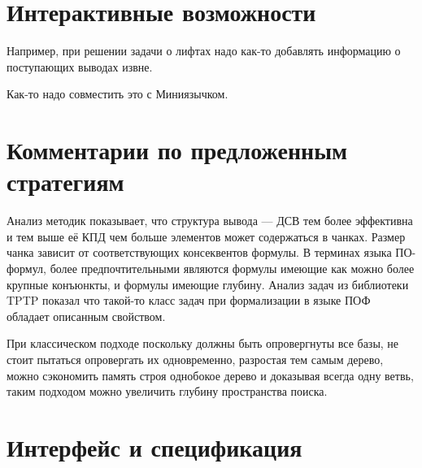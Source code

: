 \section{Интерактивные возможности}
Например, при решении задачи о лифтах надо как-то добавлять информацию о поступающих выводах извне.

Как-то надо совместить это с Миниязычком.

\section{Комментарии по предложенным стратегиям}
Анализ методик показывает, что структура вывода --- ДСВ тем более эффективна и тем выше её КПД чем больше элементов может содержаться в чанках. Размер чанка зависит от соответствующих консеквентов формулы. В терминах языка ПО-формул, более предпочтительными являются формулы имеющие как можно более крупные конъюнкты, и формулы имеющие глубину. Анализ задач из библиотеки TPTP показал что такой-то класс задач при формализации в языке ПОФ обладает описанным свойством.

При классическом подходе поскольку должны быть опровергнуты все базы, не стоит пытаться опровергать их одновременно, разростая тем самым дерево, можно сэкономить память строя однобокое дерево и доказывая всегда одну ветвь, таким подходом можно увеличить глубину пространства поиска.


\section{Интерфейс и спецификация}




